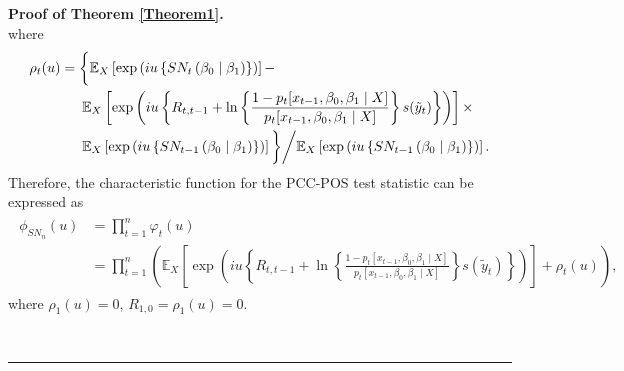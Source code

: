 \documentclass[harvard,11pt]{article}
\newcommand{\E}{\mathbb{E}}
\newenvironment{proof}[1][Proof]{\textbf{#1.} }{\  \rule{0.5em}{0.5em}}
\begin{document}
\begin{proof}[Proof of Theorem \protect\ref{Theorem1}]
\[\]
where 
\begingroup
\allowdisplaybreaks
\begin{align*}
\rho_t(u)&=\bigg\{\E_X\left[\exp\left(iu\left\{SN_t\left(\beta_0\mid\beta_1\right)\right\}\right)\right]-\\
&\textcolor{white}{=}\textcolor{white}{=}\E_X\left[\exp\left(iu\left\{R_{t,t-1}+\ln\left\{\frac{1-p_t[x_{t-1},\beta_0,\beta_1\mid X]}{p_t[x_{t-1},\beta_0,\beta_1\mid X]}\right\}s(\tilde{y}_t)\right\}\right)\right]\times\\
&\textcolor{white}{=}\textcolor{white}{=}\E_X\left[\exp\left(iu\left\{SN_{t-1}\left(\beta_0\mid\beta_1\right)\right\}\right)\right]\bigg\}\bigg/ \E_X\left[\exp\left(iu\left\{SN_{t-1}\left(\beta_0\mid\beta_1\right)\right\}\right)\right].
\end{align*}
\endgroup
Therefore, the characteristic function for the PCC-POS test statistic can be expressed as 
\begingroup
\allowdisplaybreaks
\begin{align}
\begin{split}\label{eq: Fourier-inverse}
\phi_{SN_n}(u)&=\prod\limits_{t=1}^{n}\varphi_t(u)\\
&=\prod\limits_{t=1}^{n}\left(\E_X\left[\exp\left(iu\left\{R_{t,t-1}+\ln\left\{\frac{1-p_t[x_{t-1},\beta_0,\beta_1\mid X]}{p_t[x_{t-1},\beta_0,\beta_1\mid X]}\right\}s(\tilde{y}_t)\right\}\right)\right]+\rho_t(u)\right),
\end{split}
\end{align}
\endgroup
where $\rho_1(u)=0$, $R_{1,0}=\rho_1(u)=0$. 


\end{proof}
\end{document}
